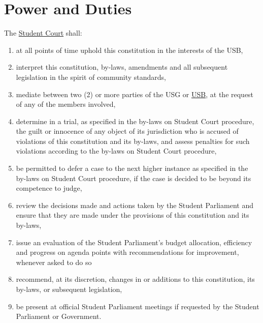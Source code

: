 \documentclass[12pt]{LaTeX_Misc/constitution}
\begin{document}
\section{Power and Duties}
The \hyperref[StudentCourtDef]{Student Court} shall:
\begin{enumerate}
\item at all points of time uphold this constitution in the interests of the USB,
\item interpret this constitution, by-laws, amendments and all subsequent legislation in the spirit
of community standards,
\item mediate between two (2) or more parties of the USG or \hyperref[studentbody]{USB}, at the request of any of
the members involved,
\item determine in a trial, as specified in the by-laws on Student Court procedure, the guilt or
innocence of any object of its jurisdiction who is accused of violations of this constitution
and its by-laws, and assess penalties for such violations according to the by-laws on
Student Court procedure,
\item  be permitted to defer a case to the next higher instance as specified in the by-laws on
Student Court procedure, if the case is decided to be beyond its competence to judge,
\item review the decisions made and actions taken by the Student Parliament and ensure that
they are made under the provisions of this constitution and its by-laws,
\item issue an evaluation of the Student Parliament's budget allocation, efficiency and
progress on agenda points with recommendations for improvement, whenever asked to do so
\item recommend, at its discretion, changes in or additions to this constitution, its by-laws, or
subsequent legislation,
\item be present at official Student Parliament meetings if requested by the Student Parliament
or Government. 
\end{enumerate}
\end{document}
